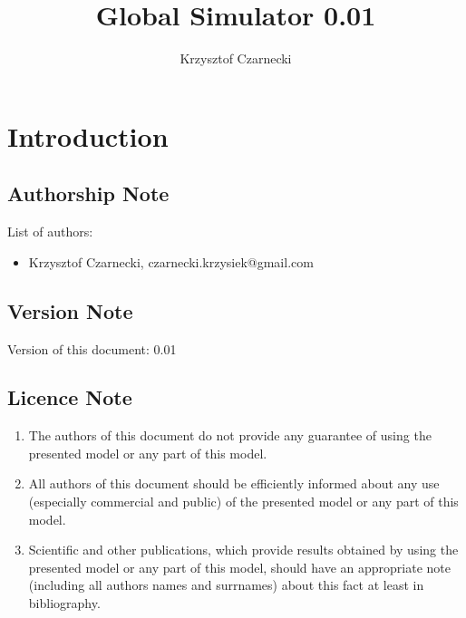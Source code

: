 \documentclass[a4paper,oneside,titlepage]{report}
\begin{document}
\author{Krzysztof Czarnecki}
\title{Global Simulator 0.01}
\thispagestyle{empty}
\maketitle

\newpage
\tableofcontents

\newpage
{}


\chapter{Introduction}
\section{Authorship Note}
List of authors:
\begin{itemize}
\item Krzysztof Czarnecki, czarnecki.krzysiek@gmail.com
\end{itemize}
\section{Version Note}

Version of this document: 0.01

\section{Licence Note}
\begin{enumerate}
\item The authors of this document do not provide any guarantee of using the presented model or any part of this model.
\item All authors of this document should be efficiently informed about any use (especially commercial and public) of the presented model or any part of this model.
\item Scientific and other publications, which provide results obtained by using the presented model or any part of this model, should have an appropriate note (including all authors names and surrnames) about this fact at least in bibliography.
\end{enumerate}
\end{document}
